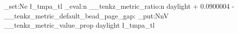 \documentclass{standalone}
\begin{document}
{
\ExplSyntaxOn
\tl_set:Ne \l_tmpa_tl
  {
    \fp_eval:n
      {
        \__tenkz_metric_ratio:n {daylight}
        + 0.0900004 - \__tenkz_metric_default_bead_page_gap:
      }
  }
\prop_put:NnV \g__tenkz_metric_value_prop {daylight} \l_tmpa_tl
\ExplSyntaxOff
\begin{tenkz}[
    rows={wire}, cols=1, bonds=none,
    west=none, east=none, north=none, south=none,
    frame={flat,basis={wire at (0,0), wire at (1,0)}}]
\end{tenkz}
}
\end{document}
